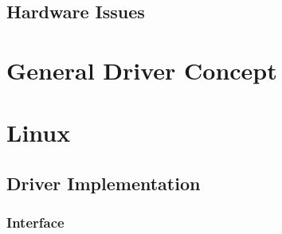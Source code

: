 \subsection{Hardware Issues}
%
%
%
%
%
%
%
%
%
%



\section{General Driver Concept}\label{sec:cs-driver-concept}


\section{Linux}\label{sec:cs-linux}


\subsection{Driver Implementation} %
\subsubsection{Interface} %
